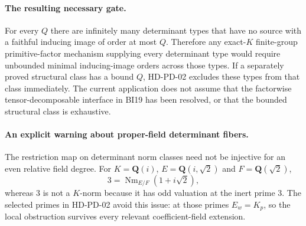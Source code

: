 \paragraph{The resulting necessary gate.}
For every $Q$ there are infinitely many determinant types
that have no source with a faithful inducing image of order
at most $Q$.  Therefore any exact-$K$ finite-group primitive-factor
mechanism supplying every determinant type would require
unbounded minimal inducing-image orders across those types.
If a separately proved structural class has a bound $Q$,
HD-PD-02 excludes these types from that class immediately.
The current application does not assume that the
factorwise tensor-decomposable interface in BI19 has been
resolved, or that the bounded structural class is exhaustive.

\paragraph{An explicit warning about proper-field determinant fibers.}
The restriction map on determinant norm classes need not be
injective for an even relative field degree.  For
$K=\mathbf Q(i)$, $E=\mathbf Q(i,\sqrt2)$ and
$F=\mathbf Q(\sqrt2)$,
\[
                 3=\operatorname{Nm}_{E/F}(1+i\sqrt2),
 \tag{PD.19}
\]
whereas $3$ is not a $K$-norm because it has odd valuation at
the inert prime $3$.  The selected primes in HD-PD-02 avoid
this issue: at those primes $E_w=K_p$, so the local obstruction
survives every relevant coefficient-field extension.
